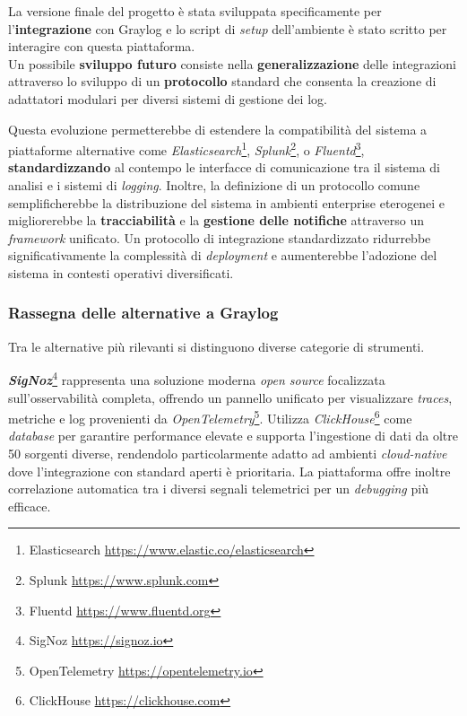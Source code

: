 \documentclass[12pt,twoside]{report}
\begin{document}
La versione finale del progetto è stata sviluppata specificamente per l'\textbf{integrazione} con Graylog e lo script di \textit{setup} dell'ambiente è stato scritto per interagire con questa piattaforma.\\
Un possibile \textbf{sviluppo futuro} consiste nella \textbf{generalizzazione} delle integrazioni attraverso lo sviluppo di un \textbf{protocollo} standard che consenta la creazione di adattatori modulari per diversi sistemi di gestione dei log.

Questa evoluzione permetterebbe di estendere la compatibilità del sistema a piattaforme alternative come \textit{Elasticsearch}\footnote{Elasticsearch \url{https://www.elastic.co/elasticsearch}}, \textit{Splunk}\footnote{Splunk \url{https://www.splunk.com}}, o \textit{Fluentd}\footnote{Fluentd \url{https://www.fluentd.org}}, \textbf{standardizzando} al contempo le interfacce di comunicazione tra il sistema di analisi e i sistemi di \textit{logging}. Inoltre, la definizione di un protocollo comune semplificherebbe la distribuzione del sistema in ambienti enterprise eterogenei e migliorerebbe la \textbf{tracciabilità} e la \textbf{gestione delle notifiche} attraverso un \textit{framework} unificato. Un protocollo di integrazione standardizzato ridurrebbe significativamente la complessità di \textit{deployment} e aumenterebbe l'adozione del sistema in contesti operativi diversificati.

\subsubsection{Rassegna delle alternative a Graylog}
\label{subsubsec:alternative_graylog}

Tra le alternative più rilevanti si distinguono diverse categorie di strumenti.

\textbf{\textit{SigNoz}}\footnote{SigNoz \url{https://signoz.io}} rappresenta una soluzione moderna \textit{open source} focalizzata sull'osservabilità completa, offrendo un pannello unificato per visualizzare \textit{traces}, metriche e log provenienti da \textit{OpenTelemetry}\footnote{OpenTelemetry \url{https://opentelemetry.io}}. Utilizza \textit{ClickHouse}\footnote{ClickHouse \url{https://clickhouse.com}} come \textit{database} per garantire performance elevate e supporta l'ingestione di dati da oltre 50 sorgenti diverse, rendendolo particolarmente adatto ad ambienti \textit{cloud-native} dove l'integrazione con standard aperti è prioritaria. La piattaforma offre inoltre correlazione automatica tra i diversi segnali telemetrici per un \textit{debugging} più efficace.
\end{document}
